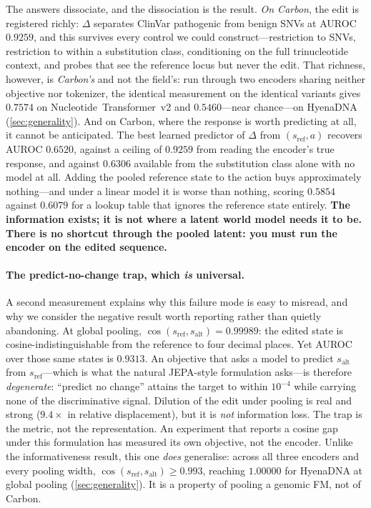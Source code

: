 \documentclass{article}
\newcommand{\sref}{s_{\mathrm{ref}}}
\newcommand{\salt}{s_{\mathrm{alt}}}
\newcommand{\D}{\Delta}
\begin{document}
The answers dissociate, and the dissociation is the result. \emph{On Carbon}, the edit is registered
richly: $\D$ separates ClinVar pathogenic from benign SNVs at AUROC $0.9259$, and this survives
every control we could construct---restriction to SNVs, restriction to within a substitution class,
conditioning on the full trinucleotide context, and probes that see the reference locus but never
the edit. That richness, however, is \emph{Carbon's} and not the field's: run through two encoders
sharing neither objective nor tokenizer, the identical measurement on the identical variants gives
$0.7574$ on Nucleotide~Transformer~v2 and $0.5460$---near chance---on HyenaDNA
(\cref{sec:generality}). And on Carbon, where the response is worth predicting at all, it cannot be
anticipated. The best learned predictor of $\D$ from $(\sref,a)$ recovers AUROC $0.6520$, against a
ceiling of $0.9259$ from reading the encoder's true response, and against $0.6306$ available from
the substitution class alone with no model at all. Adding the pooled reference state to the action
buys approximately nothing---and under a linear model it is worse than nothing, scoring $0.5854$
against $0.6079$ for a lookup table that ignores the reference state entirely. \textbf{The
information exists; it is not where a latent world model needs it to be. There is no shortcut
through the pooled latent: you must run the encoder on the edited sequence.}

\paragraph{The predict-no-change trap, which \emph{is} universal.} A second measurement explains why
this failure mode is easy to misread, and why we consider the negative result worth reporting rather
than quietly abandoning. At global pooling, $\cos(\sref,\salt)=0.99989$: the edited state is
cosine-indistinguishable from the reference to four decimal places. Yet AUROC over those same states
is $0.9313$. An objective that asks a model to predict $\salt$ from $\sref$---which is what the
natural JEPA-style formulation asks---is therefore \emph{degenerate}: ``predict no change'' attains
the target to within $10^{-4}$ while carrying none of the discriminative signal. Dilution of the
edit under pooling is real and strong ($9.4\times$ in relative displacement), but it is \emph{not}
information loss. The trap is the metric, not the representation. An experiment that reports a
cosine gap under this formulation has measured its own objective, not the encoder. Unlike the
informativeness result, this one \emph{does} generalise: across all three encoders and every pooling
width, $\cos(\sref,\salt)\ge0.993$, reaching $1.00000$ for HyenaDNA at global pooling
(\cref{sec:generality}). It is a property of pooling a genomic FM, not of Carbon.
\end{document}
